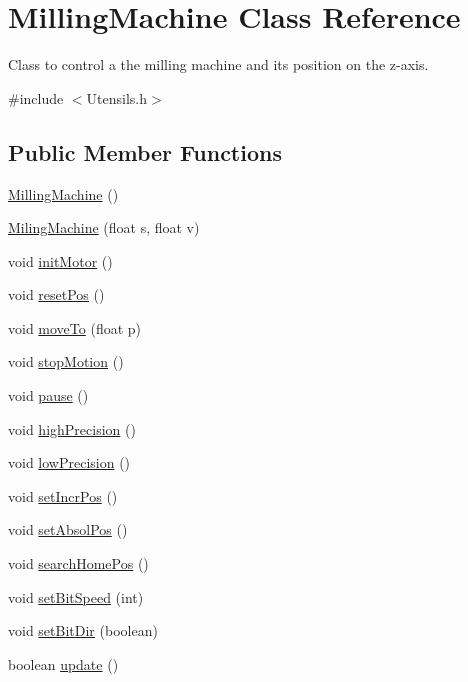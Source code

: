 \hypertarget{class_milling_machine}{\section{Milling\+Machine Class Reference}
\label{class_milling_machine}
}


Class to control a the milling machine and its position on the z-\/axis.  




{\ttfamily \#include $<$Utensils.\+h$>$}

\subsection*{Public Member Functions}
\begin{DoxyCompactItemize}
\item 
\hyperlink{class_milling_machine_adaa67d0774d9fa0ed9d51d7b5cd12a2a}{Milling\+Machine} ()
\item 
\hyperlink{class_milling_machine_a90d69a3f8ba1aa9d03dc2bb87d72db51}{Miling\+Machine} (float s, float v)
\item 
void \hyperlink{class_milling_machine_a3e6b1ab0c082b41f188151a1029b0bbf}{init\+Motor} ()
\item 
void \hyperlink{class_milling_machine_a965590d4d159254dbc9a372ea35c2d63}{reset\+Pos} ()
\item 
void \hyperlink{class_milling_machine_ac4f32a740547428b61db6e44bd600002}{move\+To} (float p)
\item 
void \hyperlink{class_milling_machine_a3b530b356897ef7b7d25f55ce8965775}{stop\+Motion} ()
\item 
void \hyperlink{class_milling_machine_a8600c252d19b2b1318400c3e8567591b}{pause} ()
\item 
void \hyperlink{class_milling_machine_a3236520b26c7ab2ebad6a89edfc67d8c}{high\+Precision} ()
\item 
void \hyperlink{class_milling_machine_a1596fbec50d30b119393c9dec4afb164}{low\+Precision} ()
\item 
void \hyperlink{class_milling_machine_a07f35ca38be74aa50663a22caeb6cd3e}{set\+Incr\+Pos} ()
\item 
void \hyperlink{class_milling_machine_a0e370f1cd0f4a3fba8dce457d8c539f0}{set\+Absol\+Pos} ()
\item 
void \hyperlink{class_milling_machine_acd02e836001192b1065fbcee5e9771cf}{search\+Home\+Pos} ()
\item 
void \hyperlink{class_milling_machine_ab49bc1d4ac057adc3381533f16bef4d4}{set\+Bit\+Speed} (int)
\item 
void \hyperlink{class_milling_machine_acdec58c95647317729dd111972a16e89}{set\+Bit\+Dir} (boolean)
\item 
boolean \hyperlink{class_milling_machine_ac74c527eb504eb6f13d80fb64487c874}{update} ()
\end{DoxyCompactItemize}


